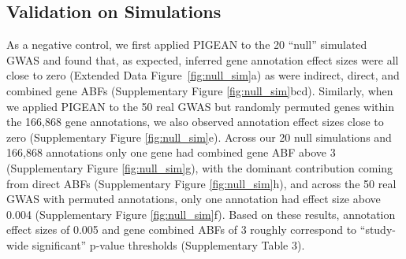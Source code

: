 \subsection{Validation on Simulations}
As a negative control, we first applied PIGEAN to the 20 “null” simulated GWAS and found that, as expected, inferred gene annotation effect sizes were all close to zero (Extended Data Figure~\ref{fig:null_sim}a) as were indirect, direct, and combined gene ABFs (Supplementary Figure \ref{fig:null_sim}bcd). Similarly, when we applied PIGEAN to the 50 real GWAS but randomly permuted genes within the 166,868 gene annotations, we also observed annotation effect sizes close to zero (Supplementary  Figure \ref{fig:null_sim}e). Across our 20 null simulations and 166,868 annotations only one gene had combined gene ABF above 3 (Supplementary Figure \ref{fig:null_sim}g), with the dominant contribution coming from direct ABFs (Supplementary Figure \ref{fig:null_sim}h), and across the 50 real GWAS with permuted annotations, only one annotation had effect size above 0.004 (Supplementary Figure \ref{fig:null_sim}f). Based on these results, annotation effect sizes of 0.005 and gene combined ABFs of 3 roughly correspond to “study-wide significant” p-value thresholds (Supplementary Table 3).

